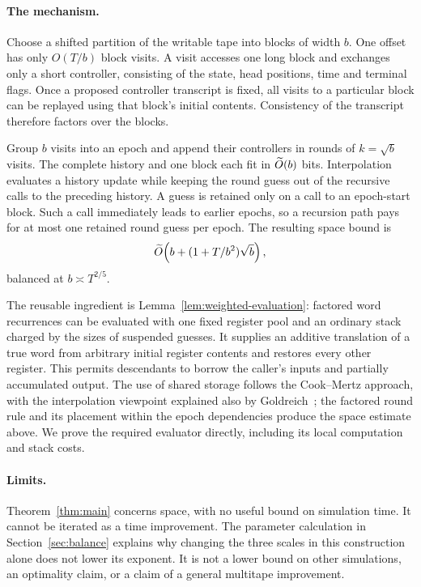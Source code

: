 \paragraph{The mechanism.}
Choose a shifted partition of the writable tape into blocks of width
\(b\). One offset has only \(O(T/b)\) block visits.
A visit accesses one long block and exchanges only a short controller,
consisting of the state, head positions, time and terminal flags.
Once a proposed controller transcript is fixed, all visits to a
particular block can be replayed using that block's initial contents.
Consistency of the transcript therefore factors over the blocks.

Group \(b\) visits into an epoch and append their controllers in rounds
of \(k=\sqrt b\) visits. The complete history and one block each fit in
\(\widetilde O(b)\) bits. Interpolation evaluates a history update while
keeping the round guess out of the recursive calls to the preceding
history. A guess is retained only on a call to an epoch-start block.
Such a call immediately leads to earlier epochs, so a recursion path
pays for at most one retained round guess per epoch.
The resulting space bound is
\[
 \widetilde O\!\left(b+(1+T/b^2)\sqrt b\right),
\]
balanced at \(b\asymp T^{2/5}\).

The reusable ingredient is Lemma~\ref{lem:weighted-evaluation}:
factored word recurrences can be evaluated with one fixed register
pool and an ordinary stack charged by the sizes of suspended guesses.
It supplies an additive translation of a true word from arbitrary
initial register contents and restores every other register.
This permits descendants to borrow the caller's inputs and partially
accumulated output. The use of shared storage follows the
Cook--Mertz approach, with the interpolation viewpoint explained also
by Goldreich~\cite{CookMertz2024,Goldreich2024}; the factored round rule
and its placement within the epoch dependencies produce the space
estimate above.
We prove the required evaluator directly, including its local
computation and stack costs.

\paragraph{Limits.}
Theorem~\ref{thm:main} concerns space, with no useful bound on simulation
time. It cannot be iterated as a time improvement.
The parameter calculation in Section~\ref{sec:balance} explains why
changing the three scales in this construction alone does not lower
its exponent. It is not a lower bound on other simulations, an
optimality claim, or a claim of a general multitape improvement.
